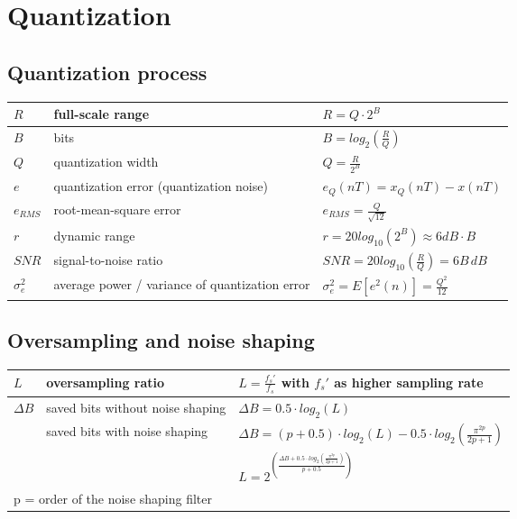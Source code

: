 \section{Quantization}

\subsection{Quantization process}
\begin{tabularx}{\textwidth}{|l|X|X|}
	\hline
	$R$			& full-scale range		& $R = Q \cdot 2^B$
	\\ \hline
	$B$			& bits					& $B = log_2 \left(\frac{R}{Q}\right)$
	\\ \hline
	$Q$			& quantization width	& $Q = \frac{R}{2^B}$
	\\ \hline
	$e$			& quantization error (quantization noise)	& $e_Q(nT) = x_Q(nT) -x(nT)$
	\\ \hline
	$e_{RMS}$	& root-mean-square error & $e_{RMS} = \frac{Q}{\sqrt{12}}$
	\\ \hline
	$r$	        & dynamic range         & $r = 20 log_{10}\left(2^B\right) \approx 6dB \cdot B$
	\\ \hline
	$SNR$		& signal-to-noise ratio	& $SNR = 20 log_{10}\left(\frac{R}{Q}\right) = 6B\, dB$
	\\ \hline
	$\sigma_e^2$& average power / variance of quantization error & $\sigma_e^2 = E[e^2(n)] = \frac{Q^2}{12}$
	\\ \hline
\end{tabularx}


\subsection{Oversampling and noise shaping}
\begin{tabularx}{0.75\textwidth}{|l|l|X|}
	\hline
	$L$	& oversampling ratio	& $L = \frac{f_s'}{f_s}$ with $f_s'$ as higher sampling rate
	\\ \hline
	$\Delta B$	& saved bits without noise shaping	& $\Delta B = 0.5 \cdot log_2(L)$ \\
				& saved bits with noise shaping		& $\Delta B = (p + 0.5) \cdot log_2(L) - 0.5 \cdot log_2\left(\frac{\pi^{2p}}{2p + 1}\right)$ \\
				& & $L = 2^{\left(\frac{\Delta B + 0.5 \cdot log_2(\frac{\pi^{2p}}{2p+1})}{p+0.5} \right)}$
	\\ \hline
	\multicolumn{3}{l}{p = order of the noise shaping filter}
\end{tabularx}

